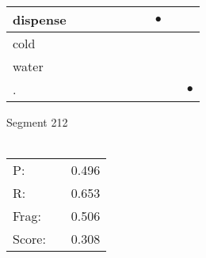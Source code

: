 \documentclass[landscape]{article}
\newcommand{\ssp}{\hspace{2pt}}
\newcommand{\mex}{\cellcolor{g}$\bullet$}
\begin{document}
\begin{tabular}{|l|p{10pt}|p{10pt}|p{10pt}|p{10pt}|p{10pt}|p{10pt}|p{10pt}|p{10pt}|p{10pt}|}
\hline
\ssp \cellcolor{ref6}dispense \ssp&\hspace{2pt}&\hspace{2pt}&\hspace{2pt}&\hspace{2pt}&\hspace{2pt}&\hspace{2pt}&\hspace{2pt}\mex&\hspace{2pt}&\hspace{2pt}\\
\hline
\ssp cold \ssp&\hspace{2pt}&\hspace{2pt}&\hspace{2pt}&\hspace{2pt}&\hspace{2pt}&\hspace{2pt}&\hspace{2pt}&\hspace{2pt}&\hspace{2pt}\\
\hline
\ssp water \ssp&\hspace{2pt}&\hspace{2pt}&\hspace{2pt}&\hspace{2pt}&\hspace{2pt}&\hspace{2pt}&\hspace{2pt}&\hspace{2pt}&\hspace{2pt}\\
\hline
\ssp \cellcolor{ref8}. \ssp&\hspace{2pt}&\hspace{2pt}&\hspace{2pt}&\hspace{2pt}&\hspace{2pt}&\hspace{2pt}&\hspace{2pt}&\hspace{2pt}&\hspace{2pt}\mex\\
\hline
\end{tabular}

\vspace{6pt}
\noindent Segment 212\\\\
\noindent\begin{tabular}{lm{12pt}r}
\hline
P:&&0.496\\
R:&&0.653\\
Frag:&&0.506\\
Score:&&0.308\\
\end{tabular}
\end{document}
